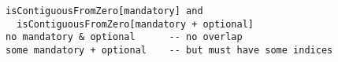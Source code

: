 \lstset{frame=tb, aboveskip=12pt, belowskip=-3pt, breaklines=true, basicstyle=\small\ttfamily, tabsize=2, mathescape=true}
\begin{lstlisting}[caption={structure.als, lines 198-201}, label=alloy:PORT_MULTIPLICITY2, captionpos=b]
isContiguousFromZero[mandatory] and
  isContiguousFromZero[mandatory + optional]
no mandatory & optional      -- no overlap
some mandatory + optional    -- but must have some indices
\end{lstlisting}